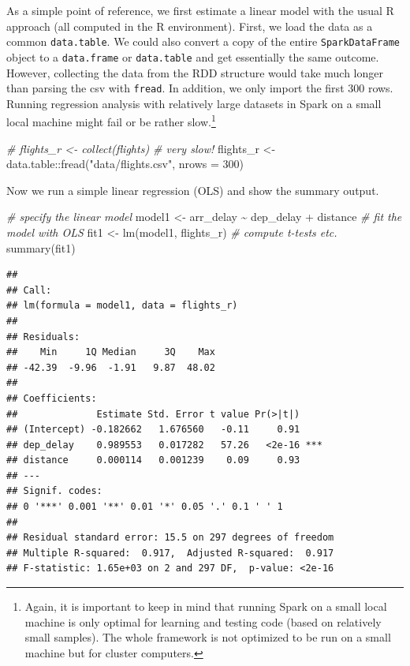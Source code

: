 \documentclass[
  12pt,
]{style/krantz}
\newenvironment{Shaded}{\begin{snugshade}}{\end{snugshade}}
\newcommand{\AttributeTok}[1]{\textcolor[rgb]{0.77,0.63,0.00}{#1}}
\newcommand{\CommentTok}[1]{\textcolor[rgb]{0.56,0.35,0.01}{\textit{#1}}}
\newcommand{\DecValTok}[1]{\textcolor[rgb]{0.00,0.00,0.81}{#1}}
\newcommand{\FunctionTok}[1]{\textcolor[rgb]{0.00,0.00,0.00}{#1}}
\newcommand{\NormalTok}[1]{#1}
\newcommand{\OtherTok}[1]{\textcolor[rgb]{0.56,0.35,0.01}{#1}}
\newcommand{\SpecialCharTok}[1]{\textcolor[rgb]{0.00,0.00,0.00}{#1}}
\newcommand{\StringTok}[1]{\textcolor[rgb]{0.31,0.60,0.02}{#1}}
\begin{document}
As a simple point of reference, we first estimate a linear model with the usual R approach (all computed in the R environment). First, we load the data as a common \texttt{data.table}. We could also convert a copy of the entire \texttt{SparkDataFrame} object to a \texttt{data.frame} or \texttt{data.table} and get essentially the same outcome. However, collecting the data from the RDD structure would take much longer than parsing the csv with \texttt{fread}. In addition, we only import the first 300 rows. Running regression analysis with relatively large datasets in Spark on a small local machine might fail or be rather slow.\footnote{Again, it is important to keep in mind that running Spark on a small local machine is only optimal for learning and testing code (based on relatively small samples). The whole framework is not optimized to be run on a small machine but for cluster computers.}

\begin{Shaded}
\begin{Highlighting}[]
\CommentTok{\# flights\_r \textless{}{-} collect(flights) \# very slow!}
\NormalTok{flights\_r }\OtherTok{\textless{}{-}}\NormalTok{ data.table}\SpecialCharTok{::}\FunctionTok{fread}\NormalTok{(}\StringTok{"data/flights.csv"}\NormalTok{, }\AttributeTok{nrows =} \DecValTok{300}\NormalTok{) }
\end{Highlighting}
\end{Shaded}

Now we run a simple linear regression (OLS) and show the summary output.

\begin{Shaded}
\begin{Highlighting}[]
\CommentTok{\# specify the linear model}
\NormalTok{model1 }\OtherTok{\textless{}{-}}\NormalTok{ arr\_delay }\SpecialCharTok{\textasciitilde{}}\NormalTok{ dep\_delay }\SpecialCharTok{+}\NormalTok{ distance}
\CommentTok{\# fit the model with OLS}
\NormalTok{fit1 }\OtherTok{\textless{}{-}} \FunctionTok{lm}\NormalTok{(model1, flights\_r)}
\CommentTok{\# compute t{-}tests etc.}
\FunctionTok{summary}\NormalTok{(fit1)}
\end{Highlighting}
\end{Shaded}

\begin{verbatim}
## 
## Call:
## lm(formula = model1, data = flights_r)
## 
## Residuals:
##    Min     1Q Median     3Q    Max 
## -42.39  -9.96  -1.91   9.87  48.02 
## 
## Coefficients:
##              Estimate Std. Error t value Pr(>|t|)    
## (Intercept) -0.182662   1.676560   -0.11     0.91    
## dep_delay    0.989553   0.017282   57.26   <2e-16 ***
## distance     0.000114   0.001239    0.09     0.93    
## ---
## Signif. codes:  
## 0 '***' 0.001 '**' 0.01 '*' 0.05 '.' 0.1 ' ' 1
## 
## Residual standard error: 15.5 on 297 degrees of freedom
## Multiple R-squared:  0.917,  Adjusted R-squared:  0.917 
## F-statistic: 1.65e+03 on 2 and 297 DF,  p-value: <2e-16
\end{verbatim}
\end{document}
